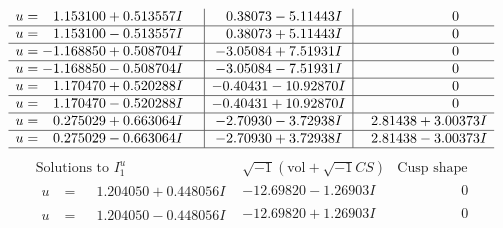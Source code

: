 \documentclass[1p]{elsarticle_modified}
\theoremstyle{definition}
\newcommand{\I}{\sqrt{-1}}
\begin{document}
$$\begin{array}{c|c|c}
\begin{aligned}
u &= \phantom{-}1.153100 + 0.513557 I\end{aligned}
 & \phantom{-}0.38073 - 5.11443 I & \phantom{-0.000000 } 0 \\ \hline\begin{aligned}
u &= \phantom{-}1.153100 - 0.513557 I\end{aligned}
 & \phantom{-}0.38073 + 5.11443 I & \phantom{-0.000000 } 0 \\ \hline\begin{aligned}
u &= -1.168850 + 0.508704 I\end{aligned}
 & -3.05084 + 7.51931 I & \phantom{-0.000000 } 0 \\ \hline\begin{aligned}
u &= -1.168850 - 0.508704 I\end{aligned}
 & -3.05084 - 7.51931 I & \phantom{-0.000000 } 0 \\ \hline\begin{aligned}
u &= \phantom{-}1.170470 + 0.520288 I\end{aligned}
 & -0.40431 - 10.92870 I & \phantom{-0.000000 } 0 \\ \hline\begin{aligned}
u &= \phantom{-}1.170470 - 0.520288 I\end{aligned}
 & -0.40431 + 10.92870 I & \phantom{-0.000000 } 0 \\ \hline\begin{aligned}
u &= \phantom{-}0.275029 + 0.663064 I\end{aligned}
 & -2.70930 - 3.72938 I & \phantom{-}2.81438 + 3.00373 I \\ \hline\begin{aligned}
u &= \phantom{-}0.275029 - 0.663064 I\end{aligned}
 & -2.70930 + 3.72938 I & \phantom{-}2.81438 - 3.00373 I\\
 \hline 
 \end{array}$$\newpage$$\begin{array}{c|c|c}  
\text{Solutions to }I^u_{1}& \I (\text{vol} + \sqrt{-1}CS) & \text{Cusp shape}\\
 \hline 
\begin{aligned}
u &= \phantom{-}1.204050 + 0.448056 I\end{aligned}
 & -12.69820 - 1.26903 I & \phantom{-0.000000 } 0 \\ \hline\begin{aligned}
u &= \phantom{-}1.204050 - 0.448056 I\end{aligned}
 & -12.69820 + 1.26903 I & \phantom{-0.000000 } 0 \\ \hline\begin{aligned}

\end{aligned}
\end{array}$$
\end{document}
